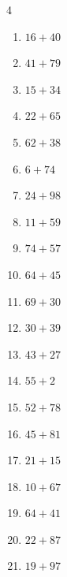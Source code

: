 \begin{multicols}{4}
\begin{enumerate}
  \item $16+40$
        \phantom{$=56$}

  \item $41+79$
        \phantom{$=120$}

  \item $15+34$
        \phantom{$=49$}

  \item $22+65$
        \phantom{$=87$}

  \item $62+38$
        \phantom{$=100$}

  \item $6+74$
        \phantom{$=80$}

  \item $24+98$
        \phantom{$=122$}

\columnbreak %

  \item $11+59$
        \phantom{$=70$}

  \item $74+57$
        \phantom{$=131$}

  \item $64+45$
        \phantom{$=109$}

  \item $69+30$
        \phantom{$=99$}

  \item $30+39$
        \phantom{$=69$}

  \item $43+27$
        \phantom{$=70$}

  \item $55+2$
        \phantom{$=57$}

  \item $52+78$
        \phantom{$=130$}

  \item $45+81$
        \phantom{$=126$}

  \item $21+15$
        \phantom{$=36$}

  \item $10+67$
        \phantom{$=77$}

  \item $64+41$
        \phantom{$=105$}

  \item $22+87$
        \phantom{$=109$}

  \item $19+97$
        \phantom{$=116$}


\end{enumerate}
\end{multicols}
